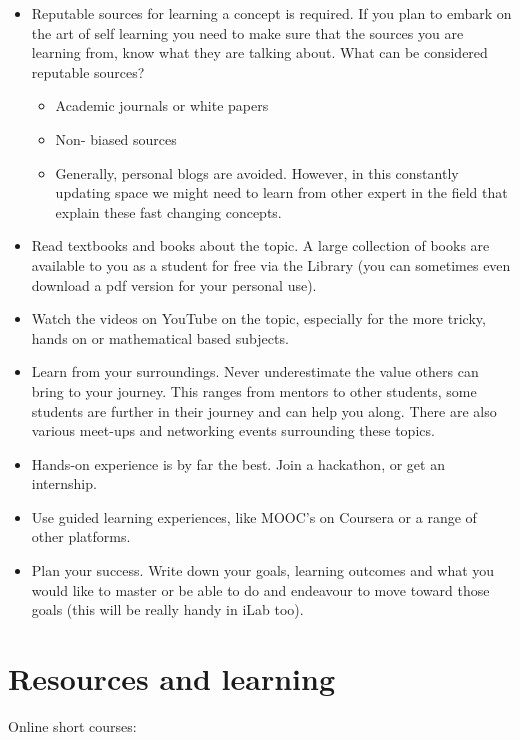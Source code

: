 \documentclass[]{book}
\providecommand{\tightlist}{%
  \setlength{\itemsep}{0pt}\setlength{\parskip}{0pt}}
\theoremstyle{definition}
\theoremstyle{definition}
\theoremstyle{remark}
\begin{document}
\begin{itemize}
\tightlist
\item
  Reputable sources for learning a concept is required. If you plan to
  embark on the art of self learning you need to make sure that the
  sources you are learning from, know what they are talking about. What
  can be considered reputable sources?

  \begin{itemize}
  \tightlist
  \item
    Academic journals or white papers
  \item
    Non- biased sources
  \item
    Generally, personal blogs are avoided. However, in this constantly
    updating space we might need to learn from other expert in the field
    that explain these fast changing concepts.
  \end{itemize}
\item
  Read textbooks and books about the topic. A large collection of books
  are available to you as a student for free via the Library (you can
  sometimes even download a pdf version for your personal use).
\item
  Watch the videos on YouTube on the topic, especially for the more
  tricky, hands on or mathematical based subjects.
\item
  Learn from your surroundings. Never underestimate the value others can
  bring to your journey. This ranges from mentors to other students,
  some students are further in their journey and can help you along.
  There are also various meet-ups and networking events surrounding
  these topics.
\item
  Hands-on experience is by far the best. Join a hackathon, or get an
  internship.
\item
  Use guided learning experiences, like MOOC's on Coursera or a range of
  other platforms.
\item
  Plan your success. Write down your goals, learning outcomes and what
  you would like to master or be able to do and endeavour to move toward
  those goals (this will be really handy in iLab too).
\end{itemize}

\section{Resources and learning}\label{resources-and-learning}

Online short courses:
\end{document}
